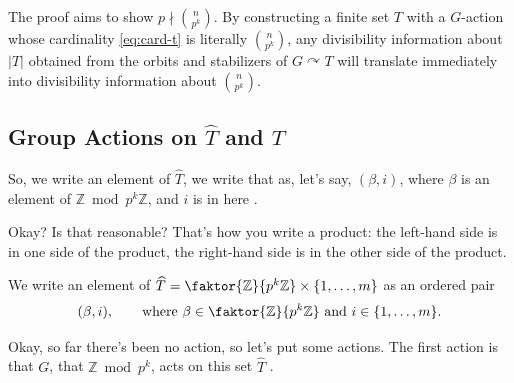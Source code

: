 \begin{proofWrapper}
\begin{content}
\begin{steps}
The proof aims to show $p \nmid \binom{n}{p^k}$. By constructing a finite set $T$ with a $G$-action whose cardinality \eqref{eq:card-t} is literally $\binom{n}{p^k}$, any divisibility information about $|T|$ obtained from the orbits and stabilizers of $G \curvearrowright T$ will translate immediately into divisibility information about $\binom{n}{p^k}$.
\end{steps}
\end{content}

\subsection{Group Actions on \texorpdfstring{$\widehat{T}$}{T-hat} and \texorpdfstring{$T$}{T}}

\begin{speech}[00:32:35 - 00:33:12]
So, we write an element of $\widehat{T}$, we write that as, let's say, $(\beta, i)$, where $\beta$ is an element of $\mathbb{Z} \bmod p^k \mathbb{Z}$, and $i$ is in here .

Okay? Is that reasonable? That's how you write a product: the left-hand side is in one side of the product, the right-hand side is in the other side of the product.
\end{speech}

\begin{content}
We write an element of $\widehat{T} = \faktor{\mathbb{Z}}{p^k\mathbb{Z}} \times \{1, \dots, m\}$ as an ordered pair
\[
(\beta, i), \qquad \text{where } \beta \in \faktor{\mathbb{Z}}{p^k\mathbb{Z}} \text{ and } i \in \{1, \dots, m\}.
\]
\end{content}

\begin{speech}[00:33:12 - 00:34:48]
Okay, so far there's been no action, so let's put some actions. The first action is that $G$, that $\mathbb{Z} \bmod p^k$, acts on this set $\widehat{T}$ .


\end{speech}
\end{proofWrapper}
